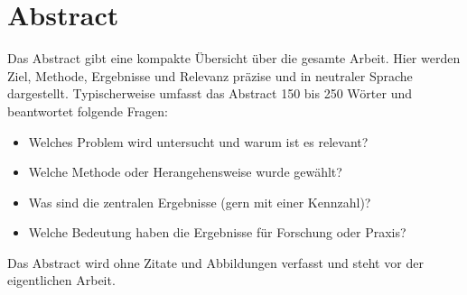 \section*{Abstract}

Das Abstract gibt eine kompakte Übersicht über die gesamte Arbeit.
Hier werden Ziel, Methode, Ergebnisse und Relevanz präzise und in neutraler Sprache dargestellt.
Typischerweise umfasst das Abstract 150 bis 250 Wörter und beantwortet folgende Fragen:

\begin{itemize}
\item Welches Problem wird untersucht und warum ist es relevant?
\item Welche Methode oder Herangehensweise wurde gewählt?
\item Was sind die zentralen Ergebnisse (gern mit einer Kennzahl)?
\item Welche Bedeutung haben die Ergebnisse für Forschung oder Praxis?
\end{itemize}

Das Abstract wird ohne Zitate und Abbildungen verfasst und steht vor der eigentlichen Arbeit.
